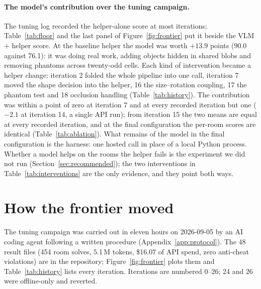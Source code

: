 \documentclass[10pt,a4paper]{article}
\begin{document}
\paragraph{The model's contribution over the tuning campaign.}
The tuning log recorded the helper-alone score at most iterations; Table~\ref{tab:floor} and the last panel of Figure~\ref{fig:frontier} put it beside the VLM + helper score. At the baseline helper the model was worth $+13.9$ points (90.0 against 76.1): it was doing real work, adding objects hidden in shared blobs and removing phantoms across twenty-odd cells. Each kind of intervention became a helper change: iteration 2 folded the whole pipeline into one call, iteration 7 moved the shape decision into the helper, 16 the size--rotation coupling, 17 the phantom test and 18 occlusion handling (Table~\ref{tab:history}). The contribution was within a point of zero at iteration 7 and at every recorded iteration but one ($-2.1$ at iteration 14, a single API run); from iteration 15 the two means are equal at every recorded iteration, and at the final configuration the per-room scores are identical (Table~\ref{tab:ablation}). What remains of the model in the final configuration is the harness: one hosted call in place of a local Python process. Whether a model helps on the rooms the helper fails is the experiment we did not run (Section~\ref{sec:recommended}); the two interventions in Table~\ref{tab:interventions} are the only evidence, and they point both ways.

\begin{table}[t]
\centering\small
\caption{Helper-alone score at each tuning iteration where the log recorded it (transcribed from \texttt{bench/BENCH.md}) beside the VLM + helper mean for the same code; $^*$ marks single API runs, the rest are two-run means. Iteration 0's helper-alone value is the log's ``before'' number at iteration 2; iteration 4 was a prompt-only change on iteration 3's helper.}
\label{tab:floor}
\resizebox{0.9\linewidth}{!}{}
\end{table}

\section{How the frontier moved}
\label{sec:trajectory}

The tuning campaign was carried out in eleven hours on 2026-09-05 by an AI coding agent following a written procedure (Appendix~\ref{app:protocol}). The 48 result files (454 room solves, 5.1\,M tokens, \$16.07 of API spend, zero anti-cheat violations) are in the repository; Figure~\ref{fig:frontier} plots them and Table~\ref{tab:history} lists every iteration. Iterations are numbered 0--26; 24 and 26 were offline-only and reverted.
\end{document}

